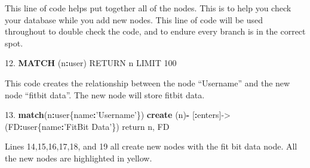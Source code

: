 \documentclass[]{book}
\newenvironment{Shaded}{\begin{snugshade}}{\end{snugshade}}
\newcommand{\KeywordTok}[1]{\textcolor[rgb]{0.13,0.29,0.53}{\textbf{#1}}}
\newcommand{\DecValTok}[1]{\textcolor[rgb]{0.00,0.00,0.81}{#1}}
\newcommand{\FloatTok}[1]{\textcolor[rgb]{0.00,0.00,0.81}{#1}}
\newcommand{\StringTok}[1]{\textcolor[rgb]{0.31,0.60,0.02}{#1}}
\newcommand{\OperatorTok}[1]{\textcolor[rgb]{0.81,0.36,0.00}{\textbf{#1}}}
\newcommand{\NormalTok}[1]{#1}
\begin{document}
This line of code helps put together all of the nodes. This is to help
you check your database while you add new nodes. This line of code will
be used throughout to double check the code, and to endure every branch
is in the correct spot.

\begin{Shaded}
\begin{Highlighting}[]
\FloatTok{12.} \KeywordTok{MATCH}\NormalTok{ (n}\OperatorTok{:}\NormalTok{user) RETURN n LIMIT }\DecValTok{100}
\end{Highlighting}
\end{Shaded}

This code creates the relationship between the node ``Username'' and the
new node ``fitbit data''. The new node will store fitbit data.

\begin{Shaded}
\begin{Highlighting}[]
\FloatTok{13.} \KeywordTok{match}\NormalTok{(n}\OperatorTok{:}\NormalTok{user\{name}\OperatorTok{:}\StringTok{'Username'}\NormalTok{\}) }\KeywordTok{create}\NormalTok{ (n)}\OperatorTok{-}\StringTok{ }\NormalTok{[}\OperatorTok{:}\NormalTok{enters]->}\StringTok{ }\NormalTok{(FD}\OperatorTok{:}\NormalTok{user\{name}\OperatorTok{:}\StringTok{'FitBit Data'}\NormalTok{\}) return n, FD}
\end{Highlighting}
\end{Shaded}

Lines 14,15,16,17,18, and 19 all create new nodes with the fit bit data
node. All the new nodes are highlighted in yellow.
\end{document}
